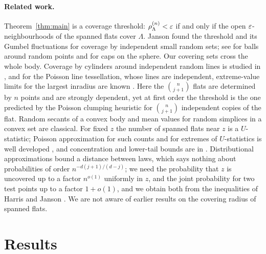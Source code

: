 \documentclass[11pt]{article}
\begin{document}
\paragraph{Related work.} Theorem~\ref{thm:main} is a coverage threshold: $\rho^{(n)}_\Lambda<\varepsilon$ if and only if the open
$\varepsilon$-neighbourhoods of the spanned flats cover $\Lambda$. Janson \cite{Janson86} found the threshold and its Gumbel fluctuations
for coverage by independent small random sets; see \cite{Hall,Penrose,PH} for balls around random points and \cite{BCL} for caps
on the sphere. Our covering sets cross the whole body. Coverage by cylinders around independent random lines is studied in
\cite{DJY}, and for the Poisson line tessellation, whose lines are independent, extreme-value limits for the largest inradius are
known \cite{CH,Chenavier}. Here the $\binom n{j+1}$ flats are determined by $n$ points and are strongly dependent, yet at first order
the threshold is the one predicted by the Poisson clumping heuristic \cite{Aldous} for $\binom n{j+1}$ independent copies of the
flat. Random secants of a convex body \cite{Kingman,Coleman} and mean values for random simplices in a convex set \cite{Groemer} are
classical. For fixed $z$ the number of spanned flats near $z$ is a $U$-statistic; Poisson approximation for such counts and for
extremes of $U$-statistics is well developed \cite{ST,DST,STbook,Otto,LM}, and concentration and lower-tail bounds are in
\cite{BR,JW}. Distributional approximations bound a distance between laws, which says nothing about probabilities of order
$n^{-d(j+1)/(d-j)}$; we need the probability that $z$ is uncovered up to a factor $n^{o(1)}$ uniformly in $z$, and the joint
probability for two test points up to a factor $1+o(1)$, and we obtain both from the inequalities of Harris \cite{Harris} and
Janson \cite{Janson}. We are not aware of earlier results on the covering radius of spanned flats.

\section{Results}\label{sec:results}
\end{document}
